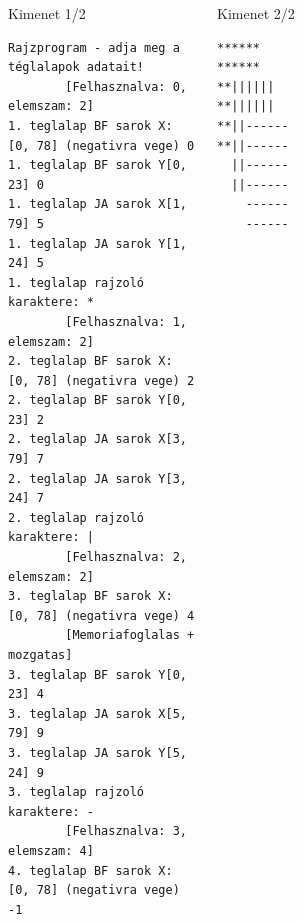 \documentclass[usenames,dvipsnames,aspectratio=169]{beamer}
\begin{document}
\begin{frame}[fragile]
  \begin{columns}[T]
      \begin{block}{Kimenet 1/2}
        \tiny
        \vspace{-.3cm}
        \begin{verbatim}
Rajzprogram - adja meg a téglalapok adatait!
        [Felhasznalva: 0, elemszam: 2]
1. teglalap BF sarok X: [0, 78] (negativra vege) 0
1. teglalap BF sarok Y[0, 23] 0
1. teglalap JA sarok X[1, 79] 5
1. teglalap JA sarok Y[1, 24] 5
1. teglalap rajzoló karaktere: *
        [Felhasznalva: 1, elemszam: 2]
2. teglalap BF sarok X: [0, 78] (negativra vege) 2
2. teglalap BF sarok Y[0, 23] 2
2. teglalap JA sarok X[3, 79] 7
2. teglalap JA sarok Y[3, 24] 7
2. teglalap rajzoló karaktere: |
        [Felhasznalva: 2, elemszam: 2]
3. teglalap BF sarok X: [0, 78] (negativra vege) 4
        [Memoriafoglalas + mozgatas]
3. teglalap BF sarok Y[0, 23] 4
3. teglalap JA sarok X[5, 79] 9
3. teglalap JA sarok Y[5, 24] 9
3. teglalap rajzoló karaktere: -
        [Felhasznalva: 3, elemszam: 4]
4. teglalap BF sarok X: [0, 78] (negativra vege) -1
\end{verbatim}
        \vspace{-.3cm}
      \end{block}
      \begin{block}{Kimenet 2/2}
        \vspace{-.3cm}
        \begin{verbatim}
******                                                                          
******                                                                          
**||||||                                                                        
**||||||                                                                        
**||------                                                                      
**||------                                                                      
  ||------                                                                      
  ||------                                                                      
    ------                                                                      
    ------
\end{verbatim}
        \vspace{-.3cm}
      \end{block}
  \end{columns}
\end{frame}
\end{document}
